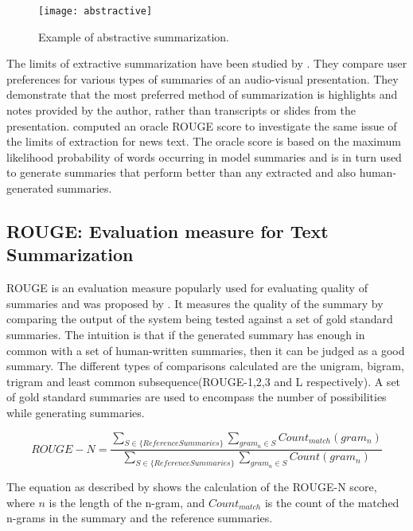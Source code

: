 \begin{figure}[!htbp]
\centering
\texttt{[image: abstractive]}
\caption{Example of abstractive summarization.}
\label{fig:abstractive}
\end{figure}

The limits of extractive summarization have been studied by \cite{he2000comparing}. They compare user preferences for various types of summaries of an audio-visual presentation. They demonstrate that the most preferred method of summarization is highlights and notes provided by the author, rather than transcripts or slides from the presentation. \cite{conroy2006topic} computed an oracle ROUGE score to investigate the same issue of the limits of extraction for news text. The oracle score is based on the maximum likelihood probability of words occurring in model summaries and is in turn used to generate summaries that perform better than any extracted and also human-generated summaries.

\subsection{ROUGE: Evaluation measure for Text Summarization}

ROUGE is an evaluation measure popularly used for evaluating quality of summaries and was proposed by \cite{lin-2004}. It measures the quality of the summary by comparing the output of the system being tested against a set of gold standard summaries. The intuition is that if the generated summary has enough in common with a set of human-written summaries, then it can be judged as a good summary. The different types of comparisons calculated are the unigram, bigram, trigram and least common subsequence(ROUGE-1,2,3 and L respectively). A set of gold standard summaries are used to encompass the number of possibilities while generating summaries. 

\begin{equation}
ROUGE-N = \frac{\sum\limits_{S \in \{Reference Summaries\}} \sum\limits_{gram_n \in S} Count_{match}(gram_n)}{\sum\limits_{S \in \{Reference Summaries\}} \sum\limits_{gram_n \in S} Count(gram_n)}
\end{equation}

The equation as described by \cite{lin2004looking} shows the calculation of the ROUGE-N score, where $n$ is the length of the n-gram, and $Count_{match}$ is the count of the matched n-grams in the summary and the reference summaries.

